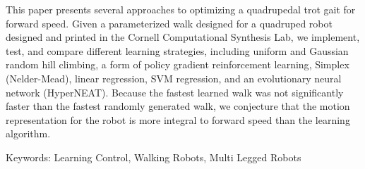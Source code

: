 This paper presents several approaches to optimizing a quadrupedal
trot gait for forward speed. Given a parameterized walk designed for
a quadruped robot designed and printed in the Cornell Computational
Synthesis Lab, we implement, test, and compare different learning strategies, 
including uniform and Gaussian random hill climbing, a form of policy 
gradient reinforcement learning\cite{1}, Simplex (Nelder-Mead), 
linear regression, SVM regression, and an evolutionary neural 
network (HyperNEAT)\cite{2}. Because the fastest learned walk was not
significantly faster than the fastest randomly generated walk, we
conjecture that the motion representation for the robot is more
integral to forward speed than the learning algorithm.

Keywords: Learning Control, Walking Robots, Multi Legged Robots
